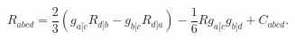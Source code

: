 \begin{equation}
R_{abcd} = \frac{2}{3} \left(g_{a[c}R_{d]b} 
- g_{b[c}R_{d]a} \right) - \frac{1}{6} R g_{a[c}g_{b]d} 
+ C_{abcd}.
\end{equation}

